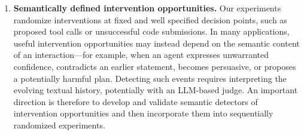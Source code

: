 \begin{enumerate}
    \item \textbf{Semantically defined intervention opportunities.}
    Our experiments randomize interventions at fixed and well specified decision points, such as proposed tool calls or unsuccessful code submissions. In many applications, useful intervention opportunities may instead depend on the semantic content of an interaction---for example, when an agent expresses unwarranted confidence, contradicts an earlier statement, becomes persuasive, or proposes a potentially harmful plan. Detecting such events requires interpreting the evolving textual history, potentially with an LLM-based judge. An important direction is therefore to develop and validate semantic detectors of intervention opportunities and then incorporate them into sequentially randomized experiments.

\end{enumerate}
